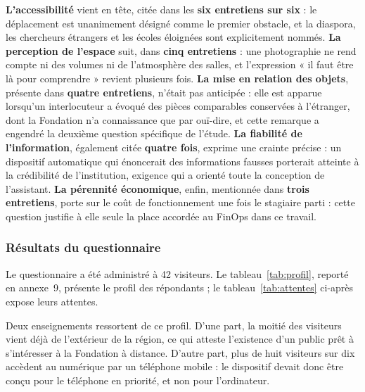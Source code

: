 \textbf{L'accessibilité} vient en tête, citée dans les \textbf{six entretiens
sur six} : le déplacement est unanimement désigné comme le premier obstacle, et
la diaspora, les chercheurs étrangers et les écoles éloignées sont explicitement
nommés. \textbf{La perception de l'espace} suit, dans \textbf{cinq entretiens} :
une photographie ne rend compte ni des volumes ni de l'atmosphère des salles, et
l'expression « il faut être là pour comprendre » revient plusieurs fois.
\textbf{La mise en relation des objets}, présente dans \textbf{quatre
entretiens}, n'était pas anticipée : elle est apparue lorsqu'un interlocuteur a
évoqué des pièces comparables conservées à l'étranger, dont la Fondation n'a
connaissance que par ouï-dire, et cette remarque a engendré la deuxième question
spécifique de l'étude. \textbf{La fiabilité de l'information}, également citée
\textbf{quatre fois}, exprime une crainte précise : un dispositif automatique
qui énoncerait des informations fausses porterait atteinte à la crédibilité de
l'institution, exigence qui a orienté toute la conception de l'assistant.
\textbf{La pérennité économique}, enfin, mentionnée dans \textbf{trois
entretiens}, porte sur le coût de fonctionnement une fois le stagiaire parti :
cette question justifie à elle seule la place accordée au FinOps dans ce
travail.

\subsubsection{Résultats du questionnaire}

Le questionnaire a été administré à 42 visiteurs. Le
tableau~\ref{tab:profil}, reporté en annexe~9, présente le profil des
répondants ; le tableau~\ref{tab:attentes} ci-après expose leurs attentes.

Deux enseignements ressortent de ce profil. D'une part, la moitié des visiteurs
vient déjà de l'extérieur de la région, ce qui atteste l'existence d'un public
prêt à s'intéresser à la Fondation à distance. D'autre part, plus de huit
visiteurs sur dix accèdent au numérique par un téléphone mobile : le dispositif
devait donc être conçu pour le téléphone en priorité, et non pour l'ordinateur.

